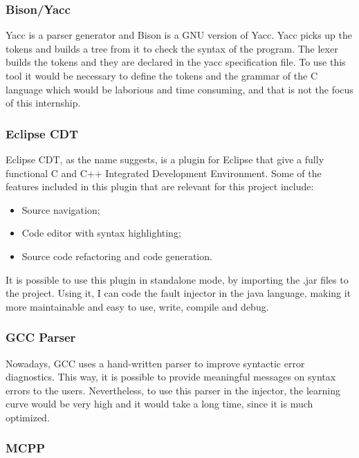 \subsubsection{Bison/Yacc}

Yacc is a parser generator and Bison is a GNU version of Yacc. Yacc picks up the tokens and builds a tree from it to check the syntax of the program. The lexer builds the tokens and they are declared in the yacc specification file. To use this tool it would be necessary to define the tokens and the grammar of the C language which would be laborious and time consuming, and that is not the focus of this internship.

\subsubsection{Eclipse CDT}

Eclipse CDT, as the name suggests, is a plugin for Eclipse that give a fully functional C and C++ Integrated Development Environment.
Some of the features included in this plugin that are relevant for this project include:
\begin{itemize}
	\item Source navigation;
	\item Code editor with syntax highlighting;
	\item Source code refactoring and code generation.
\end{itemize}

It is possible to use this plugin in standalone mode, by importing the .jar files to the project.
Using it, I can code the fault injector in the java language, making it more maintainable and easy to use, write, compile and debug.
\\

\subsubsection{GCC Parser}

Nowadays, GCC uses a hand-written parser to improve syntactic error diagnostics. This way, it is possible to provide meaningful messages on syntax errors to the users. Nevertheless, to use this parser in the injector, the learning curve would be very high and it would take a long time, since it is much optimized.\\

\subsubsection{MCPP}

